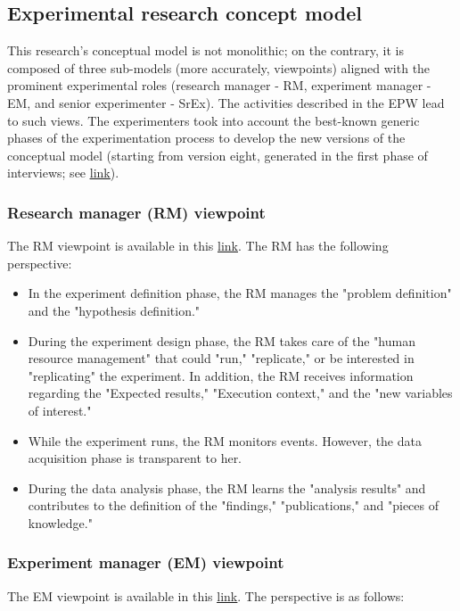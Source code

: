 \subsection{Experimental research concept model}
This research's conceptual model is not monolithic; on the contrary, it is composed of three sub-models (more accurately, viewpoints) aligned with the prominent experimental roles (research manager - RM, experiment manager - EM, and senior experimenter - SrEx). The activities described in the EPW lead to such views. The experimenters took into account the best-known generic phases of the experimentation process to develop the new versions of the conceptual model (starting from version eight, generated in the first phase of interviews; see \href{https://zenodo.org/record/7102387#.Yyt7W-zMLUI}{\ul{link}}).

\subsubsection{Research manager (RM) viewpoint}
The RM viewpoint is available in this \href{https://zenodo.org/record/7102431#.Yyxi1ezMLUJ}{\ul{link}}. The RM has the following perspective:
\begin{itemize}
	\item In the experiment definition phase, the RM manages the "problem definition" and the "hypothesis definition." 
	\item During the experiment design phase, the RM takes care of the "human resource management" that could "run," "replicate," or be interested in "replicating" the experiment. In addition, the RM receives information regarding the "Expected results," "Execution context," and the "new variables of interest."
	\item While the experiment runs, the RM monitors events. However, the data acquisition phase is transparent to her.
	\item During the data analysis phase, the RM learns the "analysis results" and contributes to the definition of the "findings," "publications," and "pieces of knowledge."
\end{itemize}

\subsubsection{Experiment manager (EM) viewpoint}
The EM viewpoint is available in this \href{https://zenodo.org/record/7102450#.YyxjmezMLUJ}{\ul{link}}. The perspective is as follows:

